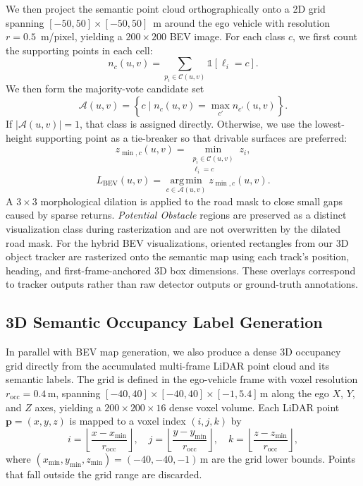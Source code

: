 \documentclass[conference]{IEEEtran}
\begin{document}
We then project the semantic point cloud orthographically onto a 2D grid spanning $[-50,50] \times [-50,50]$~m around the ego vehicle with resolution $r = 0.5$~m/pixel, yielding a $200 \times 200$ BEV image. For each class $c$, we first count the supporting points in each cell:
\begin{equation}
  n_c(u,v) = \sum_{p_i \in \mathcal{C}(u,v)} \mathbb{1}[\ell_i = c].
\end{equation}
We then form the majority-vote candidate set
\begin{equation}
  \mathcal{A}(u,v) = \left\{ c \mid n_c(u,v) = \max_{c'} n_{c'}(u,v) \right\}.
\end{equation}
If $|\mathcal{A}(u,v)| = 1$, that class is assigned directly. Otherwise, we use the lowest-height supporting point as a tie-breaker so that drivable surfaces are preferred:
\begin{equation}
  z_{\min,c}(u,v) = \min_{\substack{p_i \in \mathcal{C}(u,v) \\
  \ell_i = c}} z_i,
\end{equation}
\begin{equation}
  L_{\mathrm{BEV}}(u,v) =
  \operatorname*{arg\,min}_{c \in \mathcal{A}(u,v)} z_{\min,c}(u,v).
\end{equation}
A $3 \times 3$ morphological dilation is applied to the road mask to close small gaps caused by sparse returns. \emph{Potential Obstacle} regions are preserved as a distinct visualization class during rasterization and are not overwritten by the dilated road mask. For the hybrid BEV visualizations, oriented rectangles from our 3D object tracker are rasterized onto the semantic map using each track's position, heading, and first-frame-anchored 3D box dimensions. These overlays correspond to tracker outputs rather than raw detector outputs or ground-truth annotations.

\subsection{3D Semantic Occupancy Label Generation}
\label{sec:occ}
In parallel with BEV map generation, we also produce a dense 3D occupancy grid directly from the accumulated multi-frame LiDAR point cloud and its semantic labels. The grid is defined in the ego-vehicle frame with voxel resolution $r_{\mathrm{occ}} = 0.4$\,m, spanning $[-40, 40] \times [-40, 40] \times [-1, 5.4]$\,m along the ego $X$, $Y$, and $Z$ axes, yielding a $200 \times 200 \times 16$ dense voxel volume. Each LiDAR point $\mathbf{p} = (x, y, z)$ is mapped to a voxel index $(i, j, k)$ by
\begin{equation}
  i = \left\lfloor \frac{x - x_{\min}}{r_{\mathrm{occ}}} \right\rfloor, \quad
  j = \left\lfloor \frac{y - y_{\min}}{r_{\mathrm{occ}}} \right\rfloor, \quad
  k = \left\lfloor \frac{z - z_{\min}}{r_{\mathrm{occ}}} \right\rfloor,
\end{equation}
where $(x_{\min}, y_{\min}, z_{\min}) = (-40, -40, -1)$\,m are the grid lower bounds. Points that fall outside the grid range are discarded.
\end{document}
